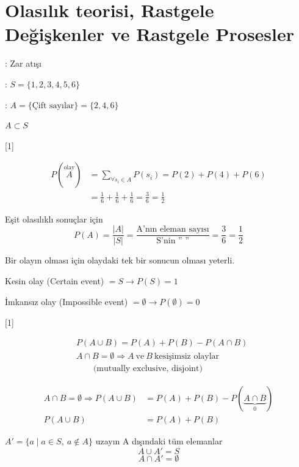 \documentclass[11pt,a4paper]{article}
\begin{document}

\section{Olasılık teorisi, Rastgele Değişkenler ve Rastgele Prosesler}

: Zar atışı


 : $S=\{1,2,3,4,5,6\}$

 : $A=\{\text{Çift sayılar}\}=\{2,4,6\}$

$A\subset S$

[1]

\begin{align*}
P(\overset{\text{olay}}{A}) &= \sum_{\forall s_i\in A} P(s_i) = P(2)+P(4)+P(6)\\
&= \frac16+\frac16+\frac16 = \frac36 = \frac12
\end{align*}

Eşit olasılıklı sonuçlar için
\[ P(A)=\frac{|A|}{|S|}=\frac{\text{A'nın eleman sayısı}}{\text{S'nin \ '' \ ''}}=\frac{3}{6}=\frac{1}{2} \]

Bir olayın olması için olaydaki tek bir sonucun olması yeterli.

Kesin olay (Certain event) $=S \rightarrow P(S)=1$

İmkansız olay (Impossible event) $=\emptyset \rightarrow P(\emptyset)=0$

[1]

\begin{align*}
&P(A\cup B)=P(A)+P(B)-P(A\cap B)\\
&A\cap B=\emptyset \Rightarrow A\ \text{ve}\ B\ \text{kesişimsiz olaylar}\\
&\qquad\text{(mutually exclusive, disjoint)}
\end{align*}

\begin{align*}
A\cap B=\emptyset \Rightarrow P(A\cup B) &= P(A)+P(B)-P(\underbrace{A\cap B}_{0})\\
P(A\cup B) &= P(A)+P(B)
\end{align*}

$A'=\{a \mid a\in S,\ a\notin A\}$ \quad uzayın A dışındaki tüm elemanlar
\[ A\cup A'=S \]
\[ A\cap A'=\emptyset \]
\end{document}
